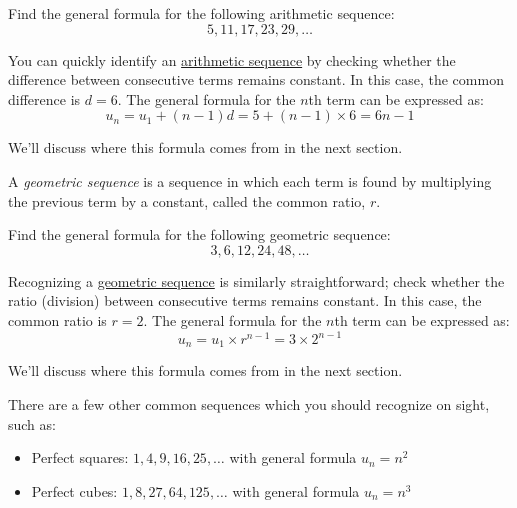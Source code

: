 \begin{exercise}
  Find the general formula for the following arithmetic sequence:
  \begin{equation*}
    5, 11, 17, 23, 29, \ldots
  \end{equation*}
\end{exercise}
\begin{answer}
  You can quickly identify an \hyperref[def:arithmetic_sequence]{arithmetic sequence} by checking whether the difference between consecutive terms
  remains constant. In this case, the common difference is $d=6$. The general formula for the $n$th term can be expressed as:
  \begin{equation*}
    u_n = u_1 + (n-1)d = 5 + (n-1) \times 6 = 6n - 1
  \end{equation*}

  \noindent We'll discuss where this formula comes from in the next section.
\end{answer}


\begin{definition}\label{def:geometric_sequence}
  A \textit{geometric sequence} is a sequence in which each term is found by multiplying the previous term by a constant, called the common ratio, $r$.
\end{definition}

\begin{exercise}
  Find the general formula for the following geometric sequence:
  \begin{equation*}
    3, 6, 12, 24, 48, \ldots
  \end{equation*}
\end{exercise}
\begin{answer}
  Recognizing a \hyperref[def:geometric_sequence]{geometric sequence} is similarly straightforward; check whether the
  ratio (division) between consecutive terms remains constant. In this case, the common ratio is $r=2$. The general formula for the $n$th term can be expressed as:
  \begin{equation*}
    u_n = u_1 \times r^{n-1} = 3 \times 2^{n-1}
  \end{equation*}

  \noindent We'll discuss where this formula comes from in the next section.
\end{answer}

There are a few other common sequences which you should recognize on sight, such as:

\begin{itemize}
  \item Perfect squares: $1, 4, 9, 16, 25, \ldots$ with general formula $u_n = n^2$
  \item Perfect cubes: $1, 8, 27, 64, 125, \ldots$ with general formula $u_n = n^3$
\end{itemize}

